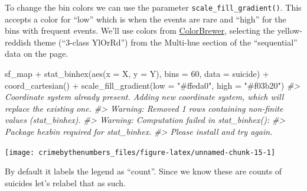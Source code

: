 \documentclass[
  12pt,
]{book}
\newenvironment{Shaded}{\begin{snugshade}}{\end{snugshade}}
\newcommand{\AttributeTok}[1]{\textcolor[rgb]{0.61,0.61,0.61}{#1}}
\newcommand{\CommentTok}[1]{\textcolor[rgb]{0.37,0.37,0.37}{\textit{#1}}}
\newcommand{\DecValTok}[1]{\textcolor[rgb]{0.06,0.06,0.06}{#1}}
\newcommand{\FunctionTok}[1]{\textcolor[rgb]{0,0,0}{#1}}
\newcommand{\NormalTok}[1]{#1}
\newcommand{\SpecialCharTok}[1]{\textcolor[rgb]{0,0,0}{#1}}
\newcommand{\StringTok}[1]{\textcolor[rgb]{0.5,0.5,0.5}{#1}}
\begin{document}
To change the bin colors we can use the parameter \texttt{scale\_fill\_gradient()}. This accepts a color for ``low'' which is when the events are rare and ``high'' for the bins with frequent events. We'll use colors from \href{http://colorbrewer2.org}{ColorBrewer}, selecting the yellow-reddish theme (``3-class YlOrRd'') from the Multi-hue section of the ``sequential'' data on the page.

\begin{Shaded}
\begin{Highlighting}[]
\NormalTok{sf\_map }\SpecialCharTok{+}
  \FunctionTok{stat\_binhex}\NormalTok{(}\FunctionTok{aes}\NormalTok{(}\AttributeTok{x =}\NormalTok{ X, }\AttributeTok{y =}\NormalTok{ Y),}
              \AttributeTok{bins  =} \DecValTok{60}\NormalTok{,}
              \AttributeTok{data =}\NormalTok{ suicide) }\SpecialCharTok{+}
  \FunctionTok{coord\_cartesian}\NormalTok{() }\SpecialCharTok{+}
  \FunctionTok{scale\_fill\_gradient}\NormalTok{(}\AttributeTok{low =} \StringTok{"\#ffeda0"}\NormalTok{,}
                      \AttributeTok{high =} \StringTok{"\#f03b20"}\NormalTok{)}
\CommentTok{\#\textgreater{} Coordinate system already present. Adding new coordinate system, which will replace the existing one.}
\CommentTok{\#\textgreater{} Warning: Removed 1 rows containing non{-}finite values (stat\_binhex).}
\CommentTok{\#\textgreater{} Warning: Computation failed in \textasciigrave{}stat\_binhex()\textasciigrave{}:}
\CommentTok{\#\textgreater{}   Package \textasciigrave{}hexbin\textasciigrave{} required for \textasciigrave{}stat\_binhex\textasciigrave{}.}
\CommentTok{\#\textgreater{}   Please install and try again.}
\end{Highlighting}
\end{Shaded}

\begin{center}\texttt{[image: crimebythenumbers\_files/figure-latex/unnamed-chunk-15-1]} \end{center}

By default it labels the legend as ``count''. Since we know these are counts of suicides let's relabel that as such.
\end{document}

